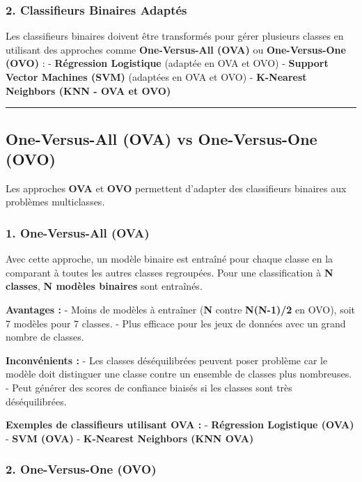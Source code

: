 \documentclass[
  letterpaper,
  DIV=11,
  numbers=noendperiod]{scrartcl}
\begin{document}
\subsubsection{2. Classifieurs Binaires
Adaptés}\label{classifieurs-binaires-adaptuxe9s}

Les classifieurs binaires doivent être transformés pour gérer plusieurs
classes en utilisant des approches comme \textbf{One-Versus-All (OVA)}
ou \textbf{One-Versus-One (OVO)} : - \textbf{Régression Logistique}
(adaptée en OVA et OVO) - \textbf{Support Vector Machines (SVM)}
(adaptées en OVA et OVO) - \textbf{K-Nearest Neighbors (KNN - OVA et
OVO)}

\begin{center}\rule{0.5\linewidth}{0.5pt}\end{center}

\subsection{One-Versus-All (OVA) vs One-Versus-One
(OVO)}\label{one-versus-all-ova-vs-one-versus-one-ovo}

Les approches \textbf{OVA} et \textbf{OVO} permettent d'adapter des
classifieurs binaires aux problèmes multiclasses.

\subsubsection{1. One-Versus-All (OVA)}\label{one-versus-all-ova}

Avec cette approche, un modèle binaire est entraîné pour chaque classe
en la comparant à toutes les autres classes regroupées. Pour une
classification à \textbf{N classes}, \textbf{N modèles binaires} sont
entraînés.

\textbf{Avantages :} - Moins de modèles à entraîner (\textbf{N} contre
\textbf{N(N-1)/2} en OVO), soit 7 modèles pour 7 classes. - Plus
efficace pour les jeux de données avec un grand nombre de classes.

\textbf{Inconvénients :} - Les classes déséquilibrées peuvent poser
problème car le modèle doit distinguer une classe contre un ensemble de
classes plus nombreuses. - Peut générer des scores de confiance biaisés
si les classes sont très déséquilibrées.

\textbf{Exemples de classifieurs utilisant OVA :} - \textbf{Régression
Logistique (OVA)} - \textbf{SVM (OVA)} - \textbf{K-Nearest Neighbors
(KNN OVA)}

\subsubsection{2. One-Versus-One (OVO)}\label{one-versus-one-ovo}
\end{document}
